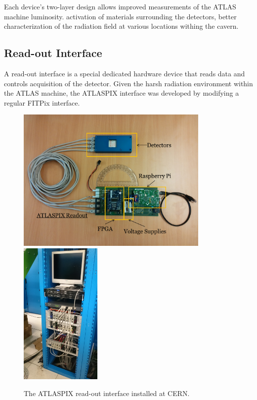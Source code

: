 Each device's two-layer design allows improved measurements of the ATLAS machine luminosity. activation of materials surrounding the detectors, better characterization of the radiation field at various locations withing the cavern.

\subsection{Read-out Interface}
A read-out interface is a special dedicated hardware device that reads data and controls acquisition of the detector. \cite{TurecekThesis2011} Given the harsh radiation environment within the ATLAS machine, the ATLASPIX interface was developed by modifying a regular FITPix interface.

\begin{figure}[t]
\begin{center}
\includegraphics[height=7cm]{figures/imported/atlaspix}
\includegraphics[height=7cm]{figures/imported/atlaspix-installed}
\caption{The ATLASPIX read-out interface installed at CERN.}
\label{fig:ATLASPIX}
\end{center}
\end{figure}

